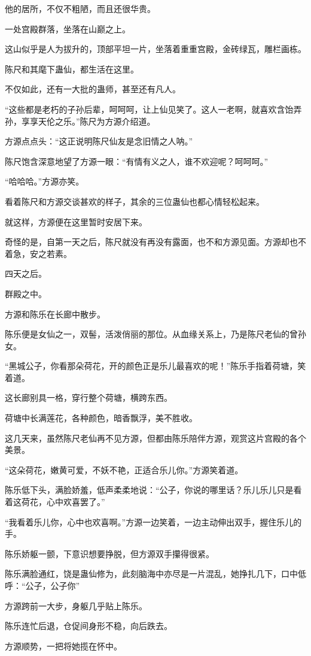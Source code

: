 \begin{this_body}
他的居所，不仅不粗陋，而且还很华贵。

一处宫殿群落，坐落在山巅之上。

这山似乎是人为拔升的，顶部平坦一片，坐落着重重宫殿，金砖绿瓦，雕栏画栋。

陈尺和其麾下蛊仙，都生活在这里。

不仅如此，还有一大批的蛊师，甚至还有凡人。

“这些都是老朽的子孙后辈，呵呵呵，让上仙见笑了。这人一老啊，就喜欢含饴弄孙，享享天伦之乐。”陈尺为方源介绍道。

方源点点头：“这正说明陈尺仙友是念旧情之人呐。”

陈尺饱含深意地望了方源一眼：“有情有义之人，谁不欢迎呢？呵呵呵。”

“哈哈哈。”方源亦笑。

看着陈尺和方源交谈甚欢的样子，其余的三位蛊仙也都心情轻松起来。

就这样，方源便在这里暂时安居下来。

奇怪的是，自第一天之后，陈尺就没有再没有露面，也不和方源见面。方源却也不着急，安之若素。

四天之后。

群殿之中。

方源和陈乐在长廊中散步。

陈乐便是女仙之一，双髻，活泼俏丽的那位。从血缘关系上，乃是陈尺老仙的曾孙女。

“黑城公子，你看那朵荷花，开的颜色正是乐儿最喜欢的呢！”陈乐手指着荷塘，笑着道。

这长廊别具一格，穿行整个荷塘，横跨东西。

荷塘中长满莲花，各种颜色，暗香飘浮，美不胜收。

这几天来，虽然陈尺老仙再不见方源，但都由陈乐陪伴方源，观赏这片宫殿的各个美景。

“这朵荷花，嫩黄可爱，不妖不艳，正适合乐儿你。”方源笑着道。

陈乐低下头，满脸娇羞，低声柔柔地说：“公子，你说的哪里话？乐儿乐儿只是看着这荷花，心中欢喜罢了。”

“我看着乐儿你，心中也欢喜啊。”方源一边笑着，一边主动伸出双手，握住乐儿的手。

陈乐娇躯一颤，下意识想要挣脱，但方源双手攥得很紧。

陈乐满脸通红，饶是蛊仙修为，此刻脑海中亦尽是一片混乱，她挣扎几下，口中低呼：“公子，公子你”

方源跨前一大步，身躯几乎贴上陈乐。

陈乐连忙后退，仓促间身形不稳，向后跌去。

方源顺势，一把将她揽在怀中。


\end{this_body}
